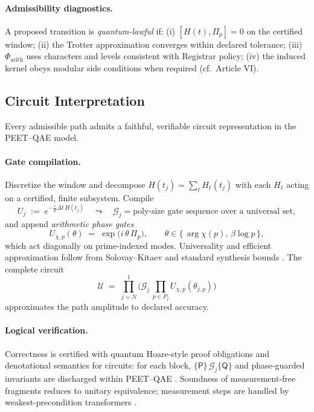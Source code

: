 \documentclass[12pt]{amsart}
\theoremstyle{plain}
\begin{document}
\paragraph{Admissibility diagnostics.}
A proposed transition is \emph{quantum-lawful} if: (i) $[H(t),\Pi_p]=0$ on the certified window; (ii) the Trotter approximation converges within declared tolerance; (iii) $\Phi_{\mathrm{arith}}$ uses characters and levels consistent with Registrar policy; (iv) the induced kernel obeys modular side conditions when required (cf.\ Article VI).

\subsection{Circuit Interpretation}

Every admissible path admits a faithful, verifiable circuit representation in the PEET–QAE model.

\paragraph{Gate compilation.}
Discretize the window and decompose $H(t_j)=\sum_{\ell}H_\ell(t_j)$ with each $H_\ell$ acting on a certified, finite subsystem. Compile
\[
U_j\;:=\;e^{-\tfrac{i}{\hbar}\Delta t\,H(t_j)}
\quad\leadsto\quad
\mathcal{G}_j=\text{poly-size gate sequence over a universal set},
\]
and append \emph{arithmetic phase gates}
\[
U_{\chi,p}(\theta)\;=\;\exp\!\big(i\,\theta\,\Pi_p\big),\qquad \theta\in\{\,\arg\chi(p),\,\beta\log p\,\},
\]
which act diagonally on prime-indexed modes. Universality and efficient approximation follow from Solovay–Kitaev and standard synthesis bounds \cite{nielsen2010quantum,dawson2005solovay}. The complete circuit
\[
\mathcal{U}\;=\;\prod_{j=N}^{1}\Big(\mathcal{G}_j\,\prod_{p\in P_j}U_{\chi,p}(\theta_{j,p})\Big)
\]
approximates the path amplitude to declared accuracy.

\paragraph{Logical verification.}
Correctness is certified with quantum Hoare-style proof obligations and denotational semantics for circuits: for each block, $\{\mathsf{P}\}\,\mathcal{G}_j\{\mathsf{Q}\}$ and phase-guarded invariants are discharged within PEET–QAE \cite{dhondt2006logic,ying2016foundations,selinger2004survey}. Soundness of measurement-free fragments reduces to unitary equivalence; measurement steps are handled by weakest-precondition transformers \cite{ying2016foundations}.
\end{document}
